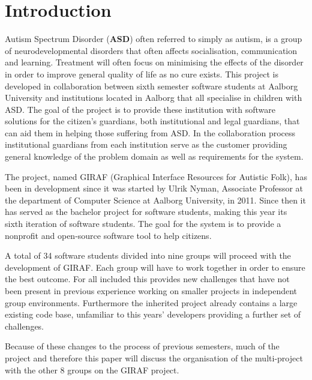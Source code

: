 \chapter{Introduction}
Autism Spectrum Disorder (\textbf{ASD}) often referred to simply as autism, is a 
group of neurodevelopmental disorders that often affects socialisation, communication and learning.
Treatment will often focus on minimising the effects of the disorder in order to improve general quality of life as no cure exists\citep{autism}.
This project is developed in collaboration between sixth semester software students at Aalborg University and institutions located in Aalborg that all specialise in children with ASD.
The goal of the project is to provide these institution with software solutions for the citizen's guardians, both institutional and legal guardians, that can aid them in helping those suffering from ASD.
In the collaboration process institutional guardians from each institution serve as the customer providing general knowledge of the problem domain as well as requirements for the system.

The project, named GIRAF (Graphical Interface Resources for Autistic Folk), has been in development since it was started by Ulrik Nyman, Associate Professor at the department of Computer Science at Aalborg University, in 2011. 
Since then it has served as the bachelor project for software students, making this year its sixth iteration of software students.
The goal for the system is to provide a nonprofit and open-source software tool to help citizens.

A total of 34 software students divided into nine groups will proceed with the development of GIRAF.
Each group will have to work together in order to ensure the best outcome.
For all included this provides new challenges that have not been present in previous experience working on smaller projects in independent group environments.
Furthermore the inherited project already contains a large existing code base, unfamiliar to this years' developers providing a further set of challenges.

Because of these changes to the process of previous semesters, much of the project and therefore this paper will discuss the organisation of the multi-project with the other 8 groups on the GIRAF project.

